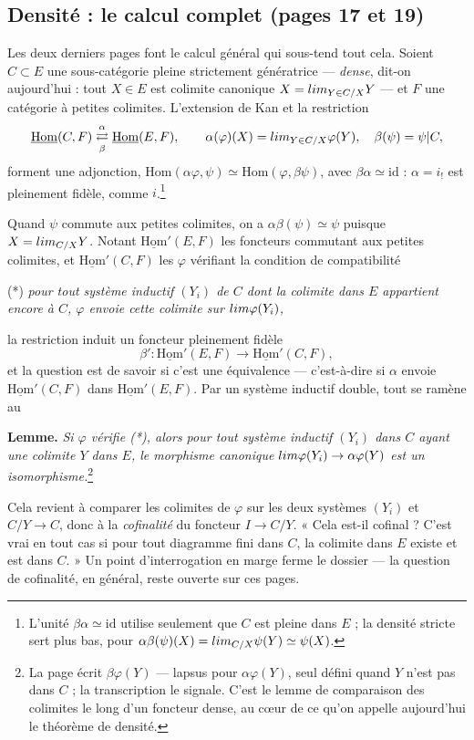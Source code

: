 \documentclass[11pt,a4paper]{article}
\begin{document}
\subsection*{Densité : le calcul complet (pages 17 et 19)}

Les deux derniers pages font le calcul général qui sous-tend tout cela.
Soient $C \subset E$ une sous-catégorie pleine strictement génératrice
— \emph{dense}, dit-on aujourd'hui : tout $X \in E$ est colimite canonique
$X = \varinjlim_{Y \in C/X} Y$ — et $F$ une catégorie à petites colimites.
L'extension de Kan et la restriction
\[
\underline{\mathrm{Hom}}(C, F)
\underset{\beta}{\overset{\alpha}{\rightleftarrows}}
\underline{\mathrm{Hom}}(E, F),
\qquad
\alpha(\varphi)(X) = \varinjlim_{Y \in C/X} \varphi(Y), \quad
\beta(\psi) = \psi|C,
\]
forment une adjonction, $\mathrm{Hom}(\alpha\varphi, \psi) \simeq
\mathrm{Hom}(\varphi, \beta\psi)$, avec $\beta\alpha \simeq \mathrm{id}$ :
$\alpha = i_!$ est pleinement fidèle, comme $i$.\footnote{L'unité
$\beta\alpha \simeq \mathrm{id}$ utilise seulement que $C$ est pleine dans
$E$ ; la densité stricte sert plus bas, pour
$\alpha\beta(\psi)(X) = \varinjlim_{C/X} \psi(Y) \simeq \psi(X)$.}

Quand $\psi$ commute aux petites colimites, on a
$\alpha\beta(\psi) \simeq \psi$ puisque $X = \varinjlim_{C/X} Y$. Notant
$\underline{\mathrm{Hom}}'(E, F)$ les foncteurs commutant aux petites
colimites, et $\underline{\mathrm{Hom}}'(C, F)$ les $\varphi$ vérifiant la
condition de compatibilité

(*) \emph{pour tout système inductif $(Y_i)$ de $C$ dont la colimite dans
$E$ appartient encore à $C$, $\varphi$ envoie cette colimite sur
$\varinjlim \varphi(Y_i)$,}

la restriction induit un foncteur pleinement fidèle
\[
\beta' : \underline{\mathrm{Hom}}'(E, F) \longrightarrow
\underline{\mathrm{Hom}}'(C, F),
\]
et la question est de savoir si c'est une équivalence — c'est-à-dire si
$\alpha$ envoie $\underline{\mathrm{Hom}}'(C, F)$ dans
$\underline{\mathrm{Hom}}'(E, F)$. Par un système inductif double, tout se
ramène au

\textbf{Lemme.} \emph{Si $\varphi$ vérifie (*), alors pour tout
système inductif $(Y_i)$ dans $C$ ayant une colimite $Y$ dans $E$, le
morphisme canonique $\varinjlim \varphi(Y_i) \to \alpha\varphi(Y)$ est un
isomorphisme.}\footnote{La page écrit $\beta\varphi(Y)$ — lapsus pour
$\alpha\varphi(Y)$, seul défini quand $Y$ n'est pas dans $C$ ; la
transcription le signale. C'est le lemme de comparaison des colimites le
long d'un foncteur dense, au cœur de ce qu'on appelle aujourd'hui le
théorème de densité.}

Cela revient à comparer les colimites de $\varphi$ sur les deux systèmes
$(Y_i)$ et $C/Y \to C$, donc à la \emph{cofinalité} du foncteur
$I \to C/Y$. « Cela est-il cofinal ? C'est vrai en tout cas si pour tout
diagramme fini dans $C$, la colimite dans $E$ existe et est dans $C$. » Un
point d'interrogation en marge ferme le dossier — la question de
cofinalité, en général, reste ouverte sur ces pages.
\end{document}
